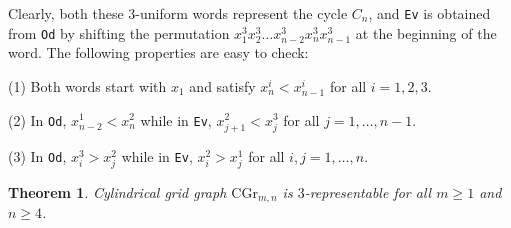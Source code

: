 \documentclass[11pt]{article}
\newtheorem{theorem}{Theorem}
\begin{document}
Clearly, both these 3-uniform words represent the cycle $C_n$, and \texttt{Ev} is obtained from \texttt{Od} by shifting the permutation $x_1^3x_2^3\ldots x_{n-2}^3x_n^3x_{n-1}^3$
at the beginning of the word. The following properties are easy to check:

(1) Both words start with $x_1$ and satisfy $x_n^i<x_{n-1}^i$  for all $i=1,2,3$.

(2) In \texttt{Od}, $x_{n-2}^1<x_n^2$ while in \texttt{Ev}, $x_{j+1}^2<x_j^3$ for all $j=1,\ldots,n-1$.

(3) In \texttt{Od}, $x_i^3>x_j^2$ while in \texttt{Ev}, $x_i^2>x_j^1$ for all  $i,j=1,\ldots,n$.

\begin{theorem}\label{cyl4}  Cylindrical grid graph $\mbox{CGr}_{m,n}$ is $3$-representable for all $m\geq 1$ and $n\ge 4$.\end{theorem}
\end{document}
